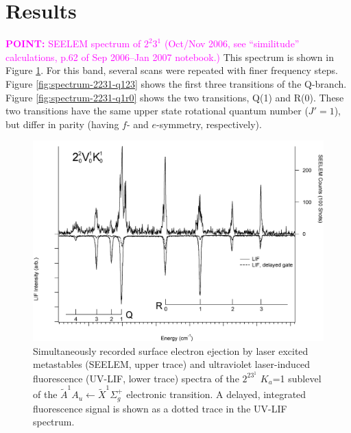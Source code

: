 \documentclass[12pt,draft]{mitthesis}
\newcommand{\POINT}[1]{\textcolor{magenta}{\textbf{POINT:} #1}}
\begin{document}
\section{Results}

\POINT{SEELEM spectrum of $2^2 3^1$ (Oct/Nov 2006, see ``similitude''
  calculations, p.62 of Sep 2006--Jan 2007 notebook.)}  This spectrum
is shown in Figure \ref{fig:spectrum-2231}.  For this band, several
scans were repeated with finer frequency steps.  Figure
\ref{fig:spectrum-2231-q123} shows the first three transitions of the
Q-branch.  Figure \ref{fig:spectrum-2231-q1r0} shows the two
transitions, Q(1) and R(0).  These two transitions have the same upper
state rotational quantum number ($J'=1$), but differ in parity (having
$f$- and $e$-symmetry, respectively).

\begin{figure}
  \caption{
    Simultaneously recorded surface electron ejection by laser excited
    metastables (SEELEM, upper trace) and ultraviolet laser-induced
    fluorescence (UV-LIF, lower trace) spectra of the $2^23^1$ $K_a$=1
    sublevel of the $\tilde{A}^1A_u \leftarrow \tilde{X} ^1\Sigma_g^+$
    electronic transition. A delayed, integrated fluorescence signal
    is shown as a dotted trace in the UV-LIF spectrum.}
  \label{fig:spectrum-2231}
  \centering
  \includegraphics[width=8in,angle=90]{spectrum-2231.png}
\end{figure}
\end{document}
